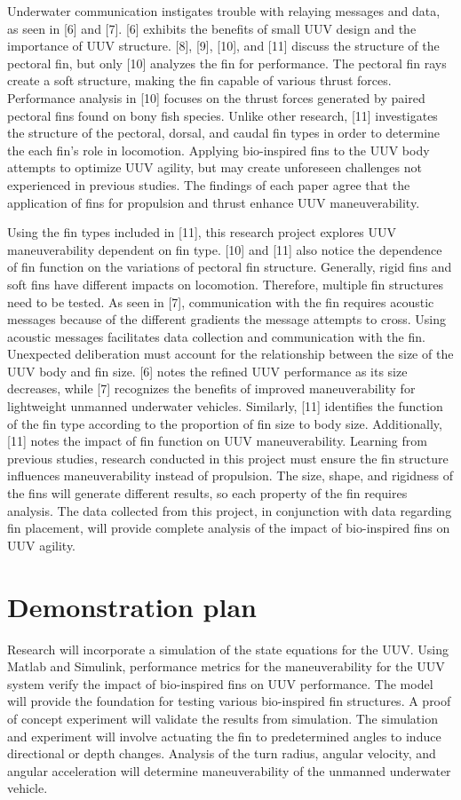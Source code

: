 \documentclass{IEEEtran}
\begin{document}
Underwater communication instigates trouble with relaying messages and data, as seen in [6] and [7].  [6] exhibits the benefits of small UUV design and the importance of UUV structure.  [8], [9], [10], and [11] discuss the structure of the pectoral fin, but only [10] analyzes the fin for performance.  The pectoral fin rays create a soft structure, making the fin capable of various thrust forces.  Performance analysis in [10] focuses on the thrust forces generated by paired pectoral fins found on bony fish species.  Unlike other research, [11] investigates the structure of the pectoral, dorsal, and caudal fin types in order to determine the each fin’s role in locomotion.  Applying bio-inspired fins to the UUV body attempts to optimize UUV agility, but may create unforeseen challenges not experienced in previous studies.  The findings of each paper agree that the application of fins for propulsion and thrust enhance UUV maneuverability.  

Using the fin types included in [11], this research project explores UUV maneuverability dependent on fin type.  [10] and [11] also notice the dependence of fin function on the variations of pectoral fin structure.  Generally, rigid fins and soft fins have different impacts on locomotion.  Therefore, multiple fin structures need to be tested.  As seen in [7], communication with the fin requires acoustic messages because of the different gradients the message attempts to cross.  Using acoustic messages facilitates data collection and communication with the fin.  Unexpected deliberation must account for the relationship between the size of the UUV body and fin size.  [6] notes the refined UUV performance as its size decreases, while [7] recognizes the benefits of improved maneuverability for lightweight unmanned underwater vehicles.  Similarly, [11] identifies the function of the fin type according to the proportion of fin size to body size.  Additionally, [11] notes the impact of fin function on UUV maneuverability.  Learning from previous studies, research conducted in this project must ensure the fin structure influences maneuverability instead of propulsion.  The size, shape, and rigidness of the fins will generate different results, so each property of the fin requires analysis.  The data collected from this project, in conjunction with data regarding fin placement, will provide complete analysis of the impact of bio-inspired fins on UUV agility.     

\section{Demonstration plan}
Research will incorporate a simulation of the state equations for the UUV.  Using Matlab and Simulink, performance metrics for the maneuverability for the UUV system verify the impact of bio-inspired fins on UUV performance. The model will provide the foundation for testing various bio-inspired fin structures.  A proof of concept experiment will validate the results from simulation.  The simulation and experiment will involve actuating the fin to predetermined angles to induce directional or depth changes.  Analysis of the turn radius, angular velocity, and angular acceleration will determine maneuverability of the unmanned underwater vehicle.  
\end{document}
